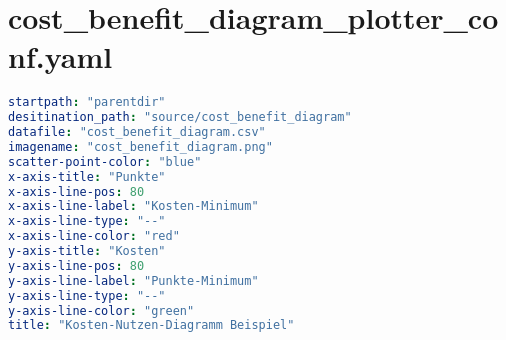 
\section{cost\_benefit\_diagram\_plotter\_conf.yaml}
\lstset{style=gra_codestyle}
\begin{lstlisting}[language=yaml, caption=Python LaTex - cost\_benefit\_diagram\_plotter\_conf.yaml - Konfigurationsdatei - Kosten-Nutzen-Diagramm,captionpos=b,label={lst:zotero_bibtex_configuration},breaklines=true]
startpath: "parentdir"
desitination_path: "source/cost_benefit_diagram"
datafile: "cost_benefit_diagram.csv"
imagename: "cost_benefit_diagram.png"
scatter-point-color: "blue"
x-axis-title: "Punkte"
x-axis-line-pos: 80
x-axis-line-label: "Kosten-Minimum"
x-axis-line-type: "--"
x-axis-line-color: "red"
y-axis-title: "Kosten"
y-axis-line-pos: 80
y-axis-line-label: "Punkte-Minimum"
y-axis-line-type: "--"
y-axis-line-color: "green"
title: "Kosten-Nutzen-Diagramm Beispiel"
\end{lstlisting}